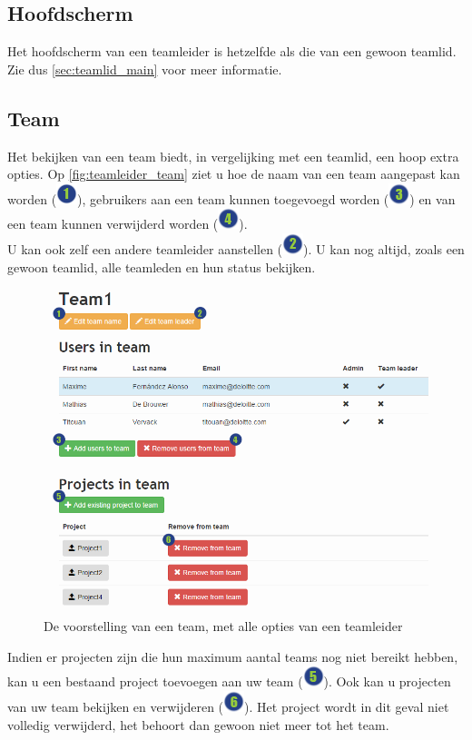 \documentclass[a4paper,11pt]{article}
\newcommand{\one}{\includegraphics[scale=0.5]{Gebruikershandleiding_img/1.png}}
\newcommand{\two}{\includegraphics[scale=0.5]{Gebruikershandleiding_img/2.png}}
\newcommand{\three}{\includegraphics[scale=0.5]{Gebruikershandleiding_img/3.png}}
\newcommand{\four}{\includegraphics[scale=0.5]{Gebruikershandleiding_img/4.png}}
\newcommand{\five}{\includegraphics[scale=0.5]{Gebruikershandleiding_img/5.png}}
\newcommand{\six}{\includegraphics[scale=0.5]{Gebruikershandleiding_img/6.png}}
\begin{document}
\subsection{Hoofdscherm}
\label{sec:teamleider_main}
Het hoofdscherm van een teamleider is hetzelfde als die van een gewoon teamlid. Zie dus \autoref{sec:teamlid_main} voor meer informatie.

\subsection{Team}
\label{sec:teamleider_team}

Het bekijken van een team biedt, in vergelijking met een teamlid, een hoop extra opties. Op \autoref{fig:teamleider_team} ziet u hoe de naam van een team aangepast kan worden (\one), gebruikers aan een team kunnen toegevoegd worden (\three) en van een team kunnen verwijderd worden (\four).\\
U kan ook zelf een andere teamleider aanstellen (\two). U kan nog altijd, zoals een gewoon teamlid, alle teamleden en hun status bekijken.

\begin{figure}[H]
\centering
\includegraphics[scale=0.5]{Gebruikershandleiding_img/team_teamleader.png}
\caption{De voorstelling van een team, met alle opties van een teamleider}
\label{fig:teamleider_team}
\end{figure}

Indien er projecten zijn die hun maximum aantal teams nog niet bereikt hebben, kan u een bestaand project toevoegen aan uw team (\five). Ook kan u projecten van uw team bekijken en verwijderen (\six). Het project wordt in dit geval niet volledig verwijderd, het behoort dan gewoon niet meer tot het team.
\end{document}
